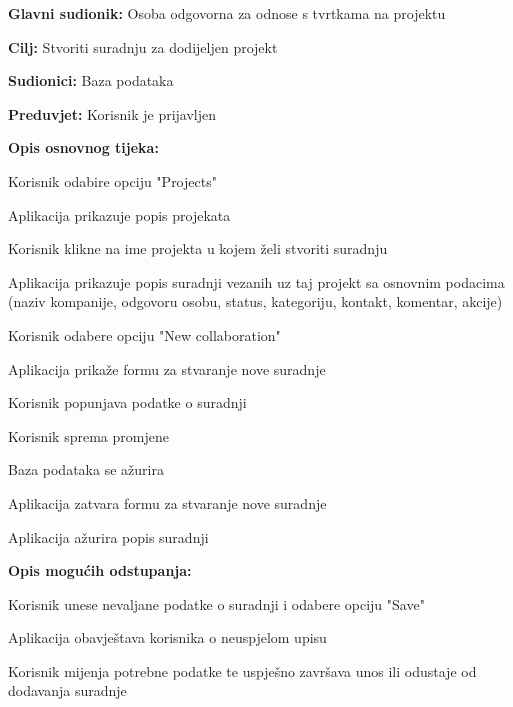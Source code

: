 					\noindent {}
					\begin{packed_item}

						\item \textbf{Glavni sudionik:} Osoba odgovorna za odnose s tvrtkama na projektu
						\item \textbf{Cilj:} Stvoriti suradnju za dodijeljen projekt
						\item \textbf{Sudionici:} Baza podataka
						\item \textbf{Preduvjet:} Korisnik je prijavljen
						\item \textbf{Opis osnovnog tijeka:}

						\item[] \begin{packed_enum}

							\item Korisnik odabire opciju "Projects"
							\item Aplikacija prikazuje popis projekata
							\item Korisnik klikne na ime projekta u kojem želi stvoriti suradnju
							\item Aplikacija prikazuje popis suradnji vezanih uz taj projekt sa osnovnim podacima (naziv kompanije, odgovoru osobu, status, kategoriju, kontakt, komentar, akcije)
							\item Korisnik odabere opciju "New collaboration"
							\item Aplikacija prikaže formu za stvaranje nove suradnje
							\item Korisnik popunjava podatke o suradnji
							\item Korisnik sprema promjene
							\item Baza podataka se ažurira
							\item Aplikacija zatvara formu za stvaranje nove suradnje
							\item Aplikacija ažurira popis suradnji
						\end{packed_enum}

						\item \textbf{Opis mogućih odstupanja:}

						\item[] \begin{packed_item}

							\item[8.c] Korisnik unese nevaljane podatke o suradnji i odabere opciju "Save"
							\item[] \begin{packed_enum}

								\item Aplikacija obavještava korisnika o neuspjelom upisu
								\item Korisnik mijenja potrebne podatke te uspješno završava unos ili
								odustaje od dodavanja suradnje

							\end{packed_enum}

						\end{packed_item}
					\end{packed_item}


